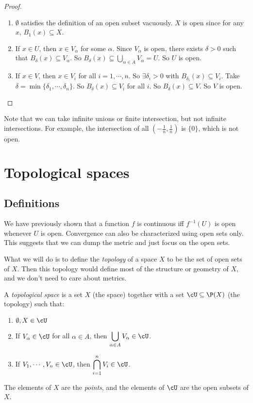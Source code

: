 \documentclass[a4paper]{article}
\begin{document}
\begin{proof}\leavevmode
  \begin{enumerate}
    \item $\emptyset$ satisfies the definition of an open subset vacuously. $X$ is open since for any $x$, $B_1(x) \subseteq X$.
    \item If $x\in U$, then $x\in V_\alpha$ for some $\alpha$. Since $V_\alpha$ is open, there exists $\delta > 0$ such that $B_\delta(x) \subseteq V_\alpha$. So $\displaystyle B_\delta (x) \subseteq \bigcup_{\alpha \in A}V_\alpha = U$. So $U$ is open.
    \item If $x\in V$, then $x\in V_i$ for all $i = 1, \cdots, n$. So $\exists \delta_i > 0$ with $B_{\delta_i}(x) \subseteq V_i$. Take $\delta = \min\{\delta_1, \cdots, \delta_n\}$. So $B_\delta(x) \subseteq V_i$ for all $i$. So $B_\delta(x) \subseteq V$. So $V$ is open.\qedhere
  \end{enumerate}
\end{proof}
Note that we can take infinite unions or finite intersection, but not infinite intersections. For example, the intersection of all $(-\frac{1}{n}, \frac{1}{n})$ is $\{0\}$, which is not open.

\section{Topological spaces}
\subsection{Definitions}
We have previously shown that a function $f$ is continuous iff $f^{-1}(U)$ is open whenever $U$ is open. Convergence can also be characterized using open sets only. This suggests that we can dump the metric and just focus on the open sets.

What we will do is to define the \emph{topology} of a space $X$ to be the set of open sets of $X$. Then this topology would define most of the structure or geometry of $X$, and we don't need to care about metrics.

\begin{defi}
  A \emph{topological space} is a set $X$ (the space) together with a set $\cU \subseteq \P(X)$ (the topology) such that:
  \begin{enumerate}
    \item $\emptyset, X\in \cU$
    \item If $V_\alpha\in \cU$ for all $\alpha \in A$, then $\displaystyle \bigcup_{\alpha\in A}V_\alpha \in \cU$.
    \item If $V_1, \cdots, V_n \in \cU$, then $\displaystyle \bigcap_{i = 1}^n V_i \in \cU$.
  \end{enumerate}
  The elements of $X$ are the \emph{points}, and the elements of $\cU$ are the open subsets of $X$.
\end{defi}
\end{document}

